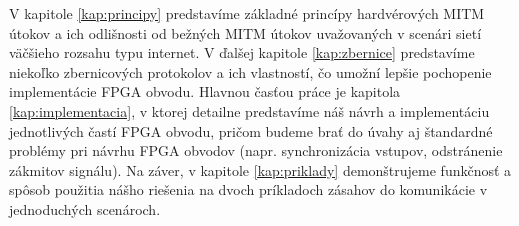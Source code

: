 V kapitole \ref{kap:principy} predstavíme základné princípy hardvérových MITM útokov a ich odlišnosti od bežných MITM útokov uvažovaných v scenári sietí väčšieho rozsahu typu internet. V ďalšej kapitole \ref{kap:zbernice} predstavíme niekoľko zbernicových protokolov a ich vlastností, čo umožní lepšie pochopenie implementácie FPGA obvodu. Hlavnou časťou práce je kapitola \ref{kap:implementacia}, v ktorej detailne predstavíme náš návrh a implementáciu jednotlivých častí FPGA obvodu, pričom budeme brať do úvahy aj štandardné problémy pri návrhu FPGA obvodov (napr. synchronizácia vstupov, odstránenie zákmitov signálu). Na záver, v kapitole \ref{kap:priklady} demonštrujeme funkčnosť a spôsob použitia nášho riešenia na dvoch príkladoch zásahov do komunikácie v jednoduchých scenároch.
